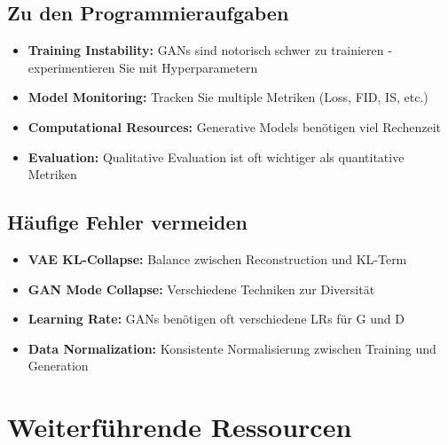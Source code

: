 \documentclass[12pt,a4paper]{article}
\begin{document}
\subsection*{Zu den Programmieraufgaben}
\begin{itemize}
    \item \textbf{Training Instability:} GANs sind notorisch schwer zu trainieren - experimentieren Sie mit Hyperparametern
    \item \textbf{Model Monitoring:} Tracken Sie multiple Metriken (Loss, FID, IS, etc.)
    \item \textbf{Computational Resources:} Generative Models benötigen viel Rechenzeit
    \item \textbf{Evaluation:} Qualitative Evaluation ist oft wichtiger als quantitative Metriken
\end{itemize}

\subsection*{Häufige Fehler vermeiden}
\begin{itemize}
    \item \textbf{VAE KL-Collapse:} Balance zwischen Reconstruction und KL-Term
    \item \textbf{GAN Mode Collapse:} Verschiedene Techniken zur Diversität
    \item \textbf{Learning Rate:} GANs benötigen oft verschiedene LRs für G und D
    \item \textbf{Data Normalization:} Konsistente Normalisierung zwischen Training und Generation
\end{itemize}

\section*{Weiterführende Ressourcen}
\end{document}
